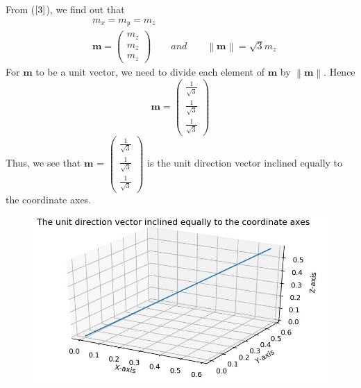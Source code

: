 \documentclass{article}
\newcommand{\myvec}[1]{\ensuremath{\begin{pmatrix}#1\end{pmatrix}}}
\newcommand{\norm}[1]{\left\lVert#1\right\rVert}
\let\vec\mathbf
\begin{document}
From ($\ref{3}$), we find out that
\begin{align}
& m_x = m_y = m_z \\
& \vec{m} = \myvec{ m_z\\ m_z \\m_z} \qquad and \qquad \norm{\vec{m}} = \sqrt{3}m_z
\end{align}
For $\vec{m}$ to be a unit vector, we need to divide each element of $\vec{m}$ by $\norm{\vec{m}}$. Hence
\begin{equation*}
\vec{m} = \myvec{\frac{1}{\sqrt{3}} \\ \frac{1}{\sqrt{3}} \\ \frac{1}{\sqrt{3}}}
\end{equation*}
Thus, we see that  $\vec{m}$ = $\myvec{ \frac{1}{\sqrt{3}} \\ \frac{1}{\sqrt{3}} \\ \frac{1}{\sqrt{3}}}$ is the unit direction vector inclined equally to the coordinate axes.
\begin{figure}[!htb]
	
	\centering
	
	\includegraphics[width=\columnwidth]{assignment1figure.jpg}
	
	\caption{\label{fig1}}
	
	\label{fig:}
	
\end{figure}
\end{document}
